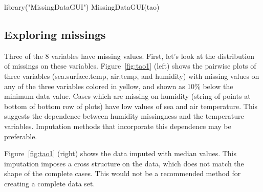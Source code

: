 \documentclass[article]{jss}
\begin{document}
\begin{Code}
library("MissingDataGUI")
MissingDataGUI(tao)
\end{Code}


\subsection{Exploring missings}

Three of the 8 variables have missing values. First, let's look
at the distribution of missings on these variables.
Figure~\ref{fig:tao1} (left) shows the pairwise plots of three
variables (sea.surface.temp, air.temp, and humidity) with
missing values on any of the three variables colored in yellow,
and shown as 10\% below the minimum data value. Cases which are
missing on humidity (string of points at bottom of bottom row
of plots) have low values of sea and air temperature. This
suggests the dependence between humidity missingness and the
temperature variables. Imputation methods that incorporate
this dependence may be preferable.

Figure~\ref{fig:tao1} (right) shows the data imputed with
median values. This imputation imposes a cross structure
on the data, which does not match the shape of the complete
cases. This would not be a recommended method for creating
a complete data set.
\end{document}
